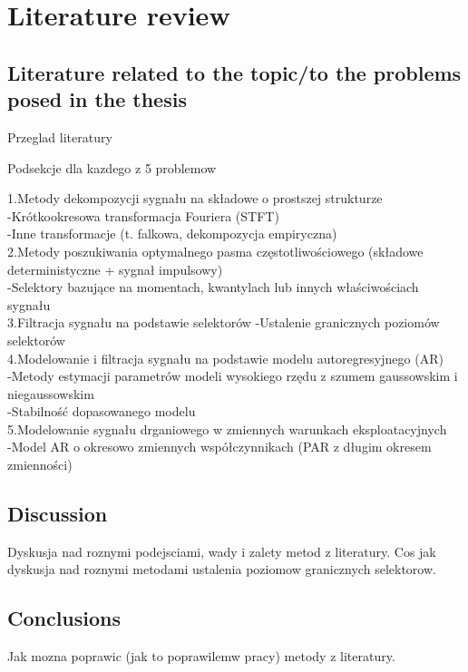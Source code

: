 \chapter{Literature review}

\label{ch:lit_review}

\section{Literature related to the topic/to the problems posed in the thesis}

Przeglad literatury

Podsekcje dla kazdego z 5 problemow

1.Metody dekompozycji sygnału na składowe o prostszej strukturze\\
-Krótkookresowa transformacja Fouriera (STFT)\\
-Inne transformacje (t. falkowa, dekompozycja empiryczna)\\
2.Metody poszukiwania optymalnego pasma częstotliwościowego (składowe deterministyczne + sygnał impulsowy)\\
-Selektory bazujące na momentach, kwantylach lub innych właściwościach sygnału\\
3.Filtracja sygnału na podstawie selektorów
-Ustalenie granicznych poziomów selektorów\\
4.Modelowanie i filtracja sygnału na podstawie modelu autoregresyjnego (AR)\\
-Metody estymacji parametrów modeli wysokiego rzędu z szumem gaussowskim i niegaussowskim\\
-Stabilność dopasowanego modelu\\
5.Modelowanie sygnału drganiowego w zmiennych warunkach eksploatacyjnych\\
-Model AR o okresowo zmiennych współczynnikach (PAR z długim okresem zmienności)

\section{Discussion}

Dyskusja nad roznymi podejsciami, wady i zalety metod z literatury. Cos jak dyskusja nad roznymi metodami ustalenia poziomow granicznych selektorow.

\section{Conclusions}
Jak mozna poprawic (jak to poprawilemw pracy) metody z literatury.